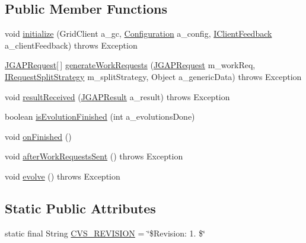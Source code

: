 \subsection*{Public Member Functions}
\begin{DoxyCompactItemize}
\item 
void \hyperlink{interfaceorg_1_1jgap_1_1distr_1_1grid_1_1_i_client_evolve_strategy_a736f4f92336bce826e0c6b663ded5f21}{initialize} (Grid\-Client a\-\_\-gc, \hyperlink{classorg_1_1jgap_1_1_configuration}{Configuration} a\-\_\-config, \hyperlink{interfaceorg_1_1jgap_1_1distr_1_1grid_1_1_i_client_feedback}{I\-Client\-Feedback} a\-\_\-client\-Feedback)  throws Exception
\item 
\hyperlink{classorg_1_1jgap_1_1distr_1_1grid_1_1_j_g_a_p_request}{J\-G\-A\-P\-Request}\mbox{[}$\,$\mbox{]} \hyperlink{interfaceorg_1_1jgap_1_1distr_1_1grid_1_1_i_client_evolve_strategy_ad6269d242d492ffe18081cd536ddf08e}{generate\-Work\-Requests} (\hyperlink{classorg_1_1jgap_1_1distr_1_1grid_1_1_j_g_a_p_request}{J\-G\-A\-P\-Request} m\-\_\-work\-Req, \hyperlink{interfaceorg_1_1jgap_1_1distr_1_1grid_1_1_i_request_split_strategy}{I\-Request\-Split\-Strategy} m\-\_\-split\-Strategy, Object a\-\_\-generic\-Data)  throws Exception
\item 
void \hyperlink{interfaceorg_1_1jgap_1_1distr_1_1grid_1_1_i_client_evolve_strategy_a2f3d53a1ae94c7614cf075ffb28332c1}{result\-Received} (\hyperlink{classorg_1_1jgap_1_1distr_1_1grid_1_1_j_g_a_p_result}{J\-G\-A\-P\-Result} a\-\_\-result)  throws Exception
\item 
boolean \hyperlink{interfaceorg_1_1jgap_1_1distr_1_1grid_1_1_i_client_evolve_strategy_aaff78a6a7edd2bd33d4fa3ef2da7cc3e}{is\-Evolution\-Finished} (int a\-\_\-evolutions\-Done)
\item 
void \hyperlink{interfaceorg_1_1jgap_1_1distr_1_1grid_1_1_i_client_evolve_strategy_ab76711fa41f5593d4241418d55bcb5ab}{on\-Finished} ()
\item 
void \hyperlink{interfaceorg_1_1jgap_1_1distr_1_1grid_1_1_i_client_evolve_strategy_aeaae129f864e230b293e3cf0fb1390a7}{after\-Work\-Requests\-Sent} ()  throws Exception
\item 
void \hyperlink{interfaceorg_1_1jgap_1_1distr_1_1grid_1_1_i_client_evolve_strategy_a4cdd91ebfcb0f94b57572f3243a5dfba}{evolve} ()  throws Exception
\end{DoxyCompactItemize}
\subsection*{Static Public Attributes}
\begin{DoxyCompactItemize}
\item 
static final String \hyperlink{interfaceorg_1_1jgap_1_1distr_1_1grid_1_1_i_client_evolve_strategy_a706bdddddffc00f62303ebaea63d3e35}{C\-V\-S\-\_\-\-R\-E\-V\-I\-S\-I\-O\-N} = \char`\"{}\$Revision\-: 1. \$\char`\"{}
\end{DoxyCompactItemize}


